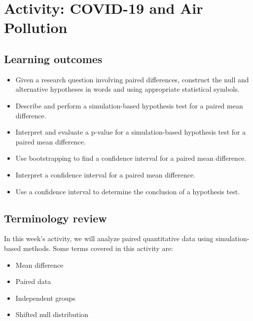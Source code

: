 \documentclass[
]{report}
\begin{document}
\newpage

\hypertarget{activity-covid-19-and-air-pollution}{%
\section{Activity: COVID-19 and Air Pollution}\label{activity-covid-19-and-air-pollution}}


\hypertarget{learning-outcomes-3}{%
\subsection{Learning outcomes}\label{learning-outcomes-3}}

\begin{itemize}
\item
  Given a research question involving paired differences, construct the null and alternative hypotheses
  in words and using appropriate statistical symbols.
\item
  Describe and perform a simulation-based hypothesis test for a paired mean difference.
\item
  Interpret and evaluate a p-value for a simulation-based hypothesis test for a paired mean difference.
\item
  Use bootstrapping to find a confidence interval for a paired mean difference.
\item
  Interpret a confidence interval for a paired mean difference.
\item
  Use a confidence interval to determine the conclusion of a hypothesis test.
\end{itemize}

\hypertarget{terminology-review-9}{%
\subsection{Terminology review}\label{terminology-review-9}}

In this week's activity, we will analyze paired quantitative data using simulation-based methods. Some terms covered in this activity are:

\begin{itemize}
\item
  Mean difference
\item
  Paired data
\item
  Independent groups
\item
  Shifted null distribution
\end{itemize}
\end{document}
